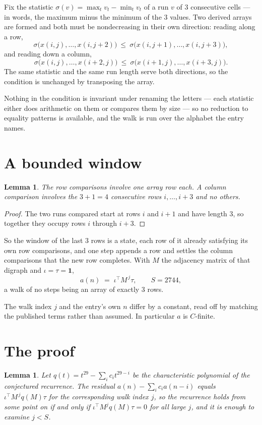 \documentclass[11pt,a4paper]{article}
\theoremstyle{plain}
\newtheorem{lemma}[theorem]{Lemma}
\theoremstyle{definition}
\begin{document}
Fix the statistic $\sigma(v)=\max_t v_t-\min_t v_t$ of a run $v$ of $3$ consecutive cells --- in words,
the maximum minus the minimum of the $3$ values. Two derived arrays are formed and both must be
nondecreasing in their own direction: reading along a row,
\[
\sigma\bigl(x(i,j),\dots,x(i,j{+}2)\bigr)\ \le\
\sigma\bigl(x(i,j{+}1),\dots,x(i,j{+}3)\bigr),
\]
and reading down a column,
\[
\sigma\bigl(x(i,j),\dots,x(i{+}2,j)\bigr)\ \le\
\sigma\bigl(x(i{+}1,j),\dots,x(i{+}3,j)\bigr).
\]
The same statistic and the same run length serve both directions, so the condition is
unchanged by transposing the array.

Nothing in the condition is invariant under renaming the letters --- each statistic either does
arithmetic on them or compares them by size --- so no reduction to equality patterns is
available, and the walk is run over the alphabet the entry names.

\section{A bounded window}

\begin{lemma}\label{lem:win}
The row comparisons involve one array row each. A column comparison involves the
$3+1=4$ consecutive rows $i,\dots,i{+}3$ and no others.
\end{lemma}

\begin{proof}
The two runs compared start at rows $i$ and $i+1$ and have length $3$, so together they
occupy rows $i$ through $i+3$.
\end{proof}

So the window of the last $3$ rows is a state, each row of it already satisfying its own row
comparisons, and one step appends a row and settles the column comparisons that the new row
completes. With $M$ the adjacency matrix of that digraph and $\iota=\tau=\mathbf{1}$,
\[
a(n)\;=\;\iota^{\!\top}M^{\,j}\tau ,\qquad S=2744,
\]
a walk of no steps being an array of exactly $3$ rows.

The walk index $j$ and the entry's own $n$ differ by a constant, read off by matching the
published terms rather than assumed. In particular $a$ is $C$-finite.

\section{The proof}

\begin{lemma}\label{lem:crit}
Let $q(t)=t^{29}-\sum_i c_it^{29-i}$ be the characteristic polynomial of the
conjectured recurrence. The residual $a(n)-\sum_ic_ia(n-i)$ equals
$\iota^{\!\top}M^{\,j}q(M)\tau$ for the corresponding walk index $j$, so the recurrence
holds from some point on if and only if $\iota^{\!\top}M^{j}q(M)\tau=0$ for all large $j$,
and it is enough to examine $j<S$.
\end{lemma}
\end{document}
